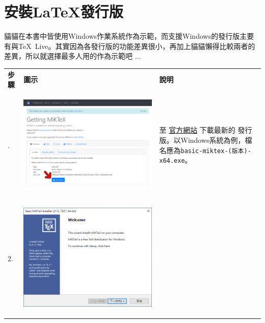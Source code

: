 \documentclass{../indiv}
\begin{document}
	\section{安裝\LaTeX 發行版 \textemdash\ }
	貓貓在本書中皆使用Windows作業系統作為示範，而支援Windows的發行版主要有與\TeX\ Live。其實因為各發行版的功能差異很小，再加上貓貓懶得比較兩者的差異，所以就選擇最多人用的作為示範吧 ...
	\begin{table}[H]
		\centering
		\OSfamily
		\setlength{\tabcolsep}{10pt}
		\begin{tabular}{Z}
			\Thline
			 \textrm{\textbf{\large 步驟}} & \textbf{\large 圖示} & \textbf{\large 說明}\\. &
			\begin{tabmp}[-0.2]
				\centering
				\includegraphics[width=\linewidth]{miktex-install-1.png}
			\end{tabmp} &
			至 \href{https://miktex.org/download}{官方網站} 下載最新的 發行版。\newline 以Windows系統為例，檔名應為\texttt{basic-miktex-(版本)-x64.exe}。\\
			2. &
			\begin{tabmp}[-0.2]
				\centering
				\includegraphics[width=0.49\linewidth]{miktex-install-2.png}

\end{tabmp}
\end{tabular}
\end{table}
\end{document}
